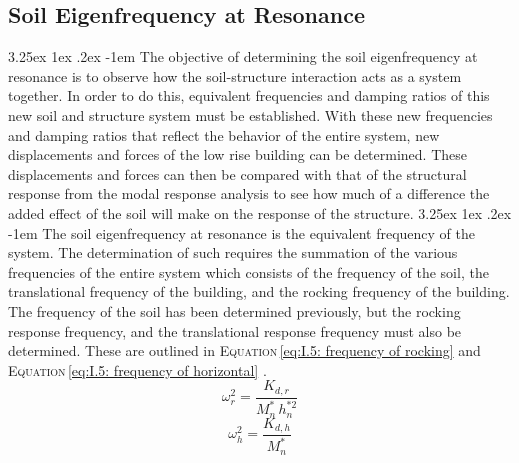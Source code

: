 \documentclass[11pt,a4paper,titlepage]{report}
\makeatletter
\renewcommand\paragraph{\@startsection{paragraph}{5}{\z@}%
  {3.25ex \@plus1ex \@minus.2ex}%
  {-1em}%
  {\normalfont\normalsize\bfseries}}
\makeatother
\begin{document}
\subsection{Soil Eigenfrequency at Resonance}
\paragraph{}The objective of determining the soil eigenfrequency at resonance is to observe how the soil-structure interaction acts as a system together. In order to do this, equivalent frequencies and damping ratios of this new soil and structure system must be established. With these new frequencies and damping ratios that reflect the behavior of the entire system, new displacements and forces of the low rise building can be determined. These displacements and forces can then be compared with that of the structural response from the modal response analysis to see how much of a difference the added effect of the soil will make on the response of the structure. 
\paragraph{}The soil eigenfrequency at resonance is the equivalent frequency of the system. The determination of such requires the summation of the various frequencies of the entire system which consists of the frequency of the soil, the translational frequency of the building, and the rocking frequency of the building. The frequency of the soil has been determined previously, but the rocking response frequency, and the translational response frequency must also be determined. These are outlined in \textsc{Equation}\,\eqref{eq:I.5: frequency of rocking} and \textsc{Equation}\,\eqref{eq:I.5: frequency of horizontal} \cite{Soil}.
\begin{equation}
    \omega_r^2=\dfrac{K_{d,r}}{M_n^*\,h_n^{*2}}
    \label{eq:I.5: frequency of rocking}
\end{equation}
\begin{equation}
    \omega_h^2=\dfrac{K_{d,h}}{M_n^*}
    \label{eq:I.5: frequency of horizontal}
\end{equation}
\end{document}
